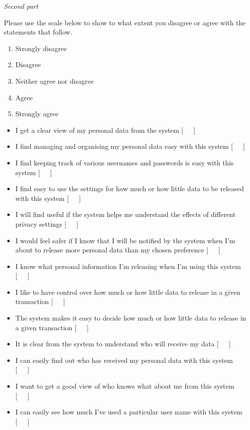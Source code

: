 \emph{Second part}

Please use the scale below to show to what extent you disagree or agree with the statements that follow.
\begin{enumerate}
\item Strongly disagree
\item Disagree
\item Neither agree nor disagree
\item Agree
\item Strongly agree
\end{enumerate}

\begin{itemize}
\item I get a clear view of my personal data from the system [~~~]
\item I find managing and organising my personal data easy with this system [~~~]
\item I find keeping track of various usernames and passwords is easy with this system [~~~]

\item I find easy to use the settings for how much or how little data to be released with this system [~~~]
\item I will  find useful if the system helps me understand the effects of different privacy settings [~~~]
\item I would feel safer if I know that I will be notified by the system when I'm about to release more personal data than my chosen preference [~~~]

\item I know what personal information I'm releasing when I’m using this system [~~~]
\item I like to have control over how much or how little data to release in a given transaction [~~~]
\item The system makes it easy to decide how much or how little data to release in a given transaction [~~~]
\item It is clear from the system to understand who will receive my data [~~~]

\item I can easily find out who has received my personal data with this system [~~~]
\item I want to get a good view of who knows what about me from this system [~~~]
\item I can easily see how much I’ve used a particular user name with this system [~~~]
\end{itemize}
